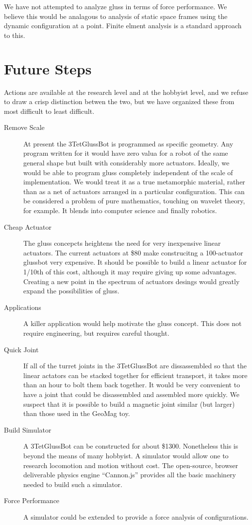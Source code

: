 \documentclass[12pt]{article}
\begin{document}
\begin{itemize}
We have not attempted to analyze gluss in terms of force performance. We believe this would
be analagous to analysis of static space frames using the dynamic configuration at a point.
Finite elment analysis is a standard approach to this.

\section{Future Steps}

Actions are available at the research level and at the hobbyist level, and we refuse to draw
a crisp distinction betwen the two, but we have organized these from most difficult to least
difficult.

\begin{description}
\item [Remove Scale] At present the 3TetGlussBot is programmed as specific geometry. Any program
  written for it would have zero valua for a robot of the same general shape but built with considerably
  more actuators. Ideally, we would be able to program gluss completely independent of the scale
  of implementation. We would treat it as a true metamorphic material, rather than as a net of
  actuators arranged in a particular configuration. This can be considered a problem of pure
  mathematics, touching on wavelet theory, for example. It blends into computer science and
  finally robotics.
\item [Cheap Actuator] The gluss concepcts heightens the need for very inexpensive linear
  actuators. The current actuators at \$80 make construcitng a 100-actuator glussbot very expensive.
  It should be possible to build a linear actuator for 1/10th of this cost, although it may require
  giving up some advantages. Creating a new point in the spectrum of actuators desings would greatly
  expand the possibilities of gluss.
\item [Applications] A killer application would help motivate the gluss concept. This does not
  require engineering, but requires careful thought.
\item [Quick Joint] If all of the turret joints in the 3TetGlussBot are dissassembled so that
  the linear actators can be stacked together for efficient transport, it takes more than an hour
  to bolt them back together. It would be very convenient to have a joint that could be
  disassembled and assembled more quickly. We suspect that it is possible to build a magnetic
  joint similar (but larger) than those used in the GeoMag toy.
\item [Build Simulator] A 3TetGlussBot can be constructed for about \$1300. Nonetheless this
  is beyond the means of many hobbyist. A simulator would allow one to research locomotion and
  motion without cost. The open-source, browser deliverable physics engine ``Cannon.js''
  provides all the basic machinery needed to build such a simulator.
\item [Force Performance] A simulator could be extended to provide a force analysis of configurations.
  

\end{description}
\end{itemize}
\end{document}
